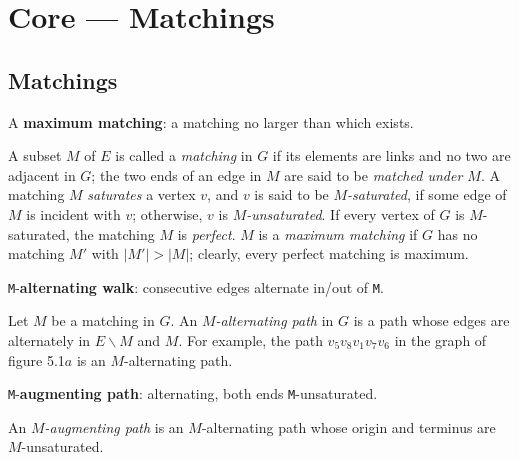 \section{Core --- Matchings}
\subsection{Matchings}


\begin{definition}
\label{SimpleGraph.Subgraph.IsMaximumMatching}
\leanok
A \textbf{maximum matching}: a matching no larger than which exists.

A subset $M$ of $E$ is called a \emph{matching} in $G$ if its elements are links and no
two are adjacent in $G$; the two ends of an edge in $M$ are said to be \emph{matched
under $M$}. A matching $M$ \emph{saturates} a vertex $v$, and $v$ is said to be
\emph{$M$-saturated}, if some edge of $M$ is incident with $v$; otherwise, $v$ is
\emph{$M$-unsaturated}. If every vertex of $G$ is $M$-saturated, the matching $M$ is
\emph{perfect}. $M$ is a \emph{maximum matching} if $G$ has no matching $M'$ with $|M'|
> |M|$; clearly, every perfect matching is maximum.
\end{definition}

\begin{definition}
\label{SimpleGraph.Walk.IsAlternatingWalk}
\leanok
\texttt{M}-\textbf{alternating walk}: consecutive edges alternate in/out of \texttt{M}.

Let $M$ be a matching in $G$. An \emph{$M$-alternating path} in $G$ is a path whose
edges are alternately in $E \backslash M$ and $M$. For example, the path $v_5 v_8 v_1
v_7 v_6$ in the graph of figure 5.1$a$ is an $M$-alternating path.
\end{definition}

\begin{definition}
\label{SimpleGraph.Walk.IsAugmenting}
\leanok
{}
\texttt{M}-\textbf{augmenting path}: alternating, both ends \texttt{M}-unsaturated.

An \emph{$M$-augmenting path} is an $M$-alternating path whose origin and terminus
are $M$-unsaturated.
\end{definition}

